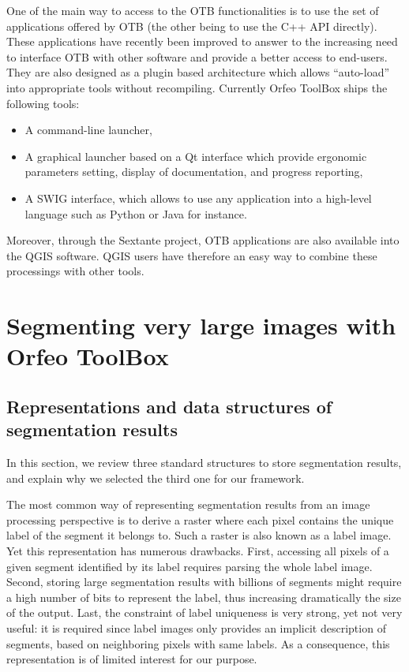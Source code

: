 \documentclass{josis}
\begin{document}
One of the main way to access to the OTB functionalities is to use the set of
applications offered by OTB (the other being to use the C++ API directly). These
applications have recently been improved to answer to the increasing need to
interface OTB with other software and provide a better access to end-users. They
are also designed as a plugin based architecture which allows ``auto-load'' into
appropriate tools without recompiling. Currently Orfeo ToolBox ships the
following tools:
\begin{itemize}
\item A command-line launcher,
\item A graphical launcher based on a Qt interface which provide
  ergonomic parameters setting, display of documentation, and progress
  reporting,
\item A SWIG interface, which allows to use any application into a
  high-level language such as Python or Java for instance.
\end{itemize}
Moreover, through the Sextante project, OTB applications are also
available into the QGIS software. QGIS users have therefore an easy
way to combine these processings with other tools.

\section{Segmenting very large images with Orfeo ToolBox}\label{sec:seg}


\subsection{Representations and data structures of segmentation results}

In this section, we review three standard structures to store
segmentation results, and explain why we selected the third one for
our framework.

The most common way of representing segmentation results from an image
processing perspective is to derive a raster where each pixel contains
the unique label of the segment it belongs to. Such a raster is also
known as a label image. Yet this representation has numerous
drawbacks. First, accessing all pixels of a given segment identified
by its label requires parsing the whole label image. Second, storing
large segmentation results with billions of segments might require a
high number of bits to represent the label, thus increasing
dramatically the size of the output. Last, the constraint of label
uniqueness is very strong, yet not very useful: it is required since
label images only provides an implicit description of segments, based
on neighboring pixels with same labels. As a consequence, this representation is of
limited interest for our purpose.
\end{document}
